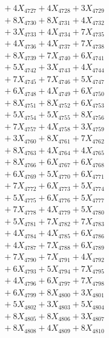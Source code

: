 \documentclass[a4paper,10pt]{article}
\begin{document}
{\begin{align}
&\;  + 4 X_{4727} + 4 X_{4728} + 3 X_{4729} \\[0.3ex]
&\;  + 8 X_{4730} + 8 X_{4731} + 4 X_{4732} \\[0.3ex]
&\;  + 3 X_{4733} + 4 X_{4734} + 7 X_{4735} \\[0.3ex]
&\;  + 4 X_{4736} + 4 X_{4737} + 7 X_{4738} \\[0.3ex]
&\;  + 8 X_{4739} + 7 X_{4740} + 6 X_{4741} \\[0.3ex]
&\;  + 5 X_{4742} + 3 X_{4743} + 4 X_{4744} \\[0.3ex]
&\;  + 7 X_{4745} + 7 X_{4746} + 5 X_{4747} \\[0.3ex]
&\;  + 6 X_{4748} + 4 X_{4749} + 6 X_{4750} \\[0.5ex]\allowbreak
&\;  + 8 X_{4751} + 8 X_{4752} + 6 X_{4753} \\[0.3ex]
&\;  + 5 X_{4754} + 5 X_{4755} + 8 X_{4756} \\[0.3ex]
&\;  + 7 X_{4757} + 4 X_{4758} + 3 X_{4759} \\[0.3ex]
&\;  + 3 X_{4760} + 8 X_{4761} + 7 X_{4762} \\[0.3ex]
&\;  + 8 X_{4763} + 4 X_{4764} + 4 X_{4765} \\[0.3ex]
&\;  + 8 X_{4766} + 6 X_{4767} + 6 X_{4768} \\[0.3ex]
&\;  + 6 X_{4769} + 5 X_{4770} + 6 X_{4771} \\[0.3ex]
&\;  + 7 X_{4772} + 6 X_{4773} + 5 X_{4774} \\[0.3ex]
&\;  + 5 X_{4775} + 6 X_{4776} + 5 X_{4777} \\[0.3ex]
&\;  + 7 X_{4778} + 4 X_{4779} + 5 X_{4780} \\[0.5ex]\allowbreak
&\;  + 5 X_{4781} + 7 X_{4782} + 7 X_{4783} \\[0.3ex]
&\;  + 4 X_{4784} + 4 X_{4785} + 6 X_{4786} \\[0.3ex]
&\;  + 4 X_{4787} + 7 X_{4788} + 6 X_{4789} \\[0.3ex]
&\;  + 7 X_{4790} + 7 X_{4791} + 4 X_{4792} \\[0.3ex]
&\;  + 6 X_{4793} + 5 X_{4794} + 7 X_{4795} \\[0.3ex]
&\;  + 4 X_{4796} + 6 X_{4797} + 7 X_{4798} \\[0.3ex]
&\;  + 6 X_{4799} + 8 X_{4800} + 3 X_{4801} \\[0.3ex]
&\;  + 5 X_{4802} + 3 X_{4803} + 5 X_{4804} \\[0.3ex]
&\;  + 8 X_{4805} + 8 X_{4806} + 3 X_{4807} \\[0.3ex]
&\;  + 8 X_{4808} + 4 X_{4809} + 8 X_{4810} \\[0.5ex]\allowbreak

\end{align}}
\end{document}
